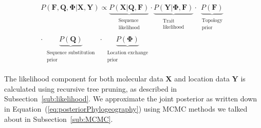 \begin{eqnarray}
P\left(\mathbf{F}, \mathbf{Q}, \mathbf{\Phi}|\mathbf{X},\mathbf{Y}\right)\propto 
\underbrace{P(\mathbf{X}|\mathbf{Q}, \mathbf{F})}_{\begin{array}{c}
\substack{\text{Sequence} \\ \text{likelihood}}
\end{array}}\cdot\underbrace{P(\mathbf{Y}|\mathbf{\Phi}, \mathbf{F})}_{\begin{array}{c}
\substack{\text{Trait} \\ \text{likelihood}}
\end{array}}\cdot
\underbrace{P(\mathbf{F})}_{\begin{array}{c}
\substack{\text{Topology} \\ \text{prior}}
\end{array}} \\ \nonumber
\cdot\underbrace{P(\mathbf{Q})}_{\begin{array}{c}
\substack{\text{Sequence substitution} \\ \text{prior}}
\end{array}}\cdot\underbrace{P(\mathbf{\Phi})}_{\begin{array}{c}
\substack{\text{Location exchange} \\ \text{prior}}
\end{array}}
\label{eq:posteriorPhylogeography}
\end{eqnarray}

The likelihood component for both molecular data $\mathbf{X}$ and location data $\mathbf{Y}$ is calculated using recursive tree pruning, as described in Subsection~\ref{sub:likelihood}.
We approximate the joint posterior as written down in Equation~(\ref{eq:posteriorPhylogeography}) using MCMC methods we talked about in Subsection~\ref{sub:MCMC}.
